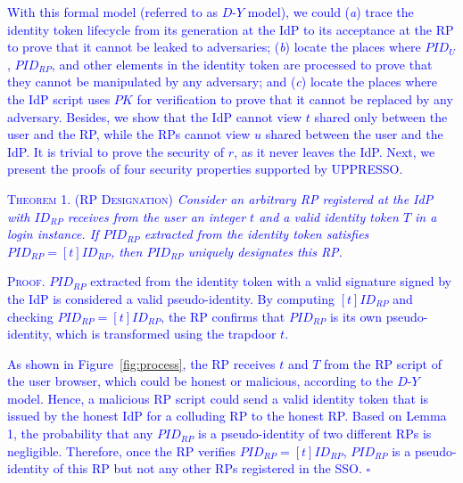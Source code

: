 \textcolor{blue}{With this formal model (referred to as $D$-$Y$ model), we could (\emph{a}) trace the identity token lifecycle from its generation at the IdP to its acceptance at the RP to prove that it cannot be leaked to adversaries; (\emph{b}) locate the places where $PID_U$, $PID_{RP}$, and other elements in the identity token are processed to prove that they cannot be manipulated by any adversary; and (\emph{c}) locate the places where the IdP script uses $PK$ for verification to prove that it cannot be replaced by any adversary. Besides, we show that the IdP cannot view $t$ shared only between the user and the RP, while the RPs cannot view $u$ shared between the user and the IdP. It is trivial to prove the security of $r$, as it never leaves the IdP. Next, we present the proofs of four security properties supported by UPPRESSO.
}

\vspace{1mm}
\noindent\textcolor{blue}{\textsc{Theorem 1. (RP Designation)} {\em Consider an arbitrary RP registered at the IdP with $ID_{RP}$ receives from the user an integer $t$ and a valid identity token $T$ in a login instance. If $PID_{RP}$ extracted from the identity token satisfies $PID_{RP} = [t]ID_{RP}$, then $PID_{RP}$ uniquely designates this RP.}
}

\vspace{0.5mm}
\noindent\textcolor{blue}{\textsc{Proof.} $PID_{RP}$ extracted from the identity token with a valid signature signed by the IdP is considered a valid pseudo-identity. By computing $[t]ID_{RP}$ and checking $PID_{RP} = [t]ID_{RP}$, the RP confirms that $PID_{RP}$ is its own pseudo-identity, which is transformed using the trapdoor $t$.}

\textcolor{blue}{As shown in Figure~\ref{fig:process}, the RP receives $t$ and $T$ from the RP script of the user browser, which could be honest or malicious, according to the $D$-$Y$ model. Hence, a malicious RP script could send a valid identity token that is issued by the honest IdP for a colluding RP to the honest RP. Based on Lemma 1, the probability that any $PID_{RP}$ is a pseudo-identity of two different RPs is negligible. Therefore, once the RP verifies $PID_{RP} = [t]ID_{RP}$, $PID_{RP}$ is a pseudo-identity of this RP but not any other RPs registered in the SSO. \hfill $\square$}

